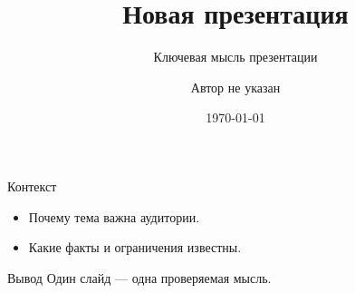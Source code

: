 \documentclass[aspectratio=169]{beamer}
\title{Новая презентация}
\subtitle{Ключевая мысль презентации}
\author{Автор не указан}
\date{\today}
\begin{document}
\begin{frame}\titlepage\end{frame}
\begin{frame}{Контекст}
  \begin{itemize}
    \item Почему тема важна аудитории.
    \item Какие факты и ограничения известны.
  \end{itemize}
\end{frame}
\begin{frame}{Вывод}
  Один слайд --- одна проверяемая мысль.
\end{frame}
\end{document}
